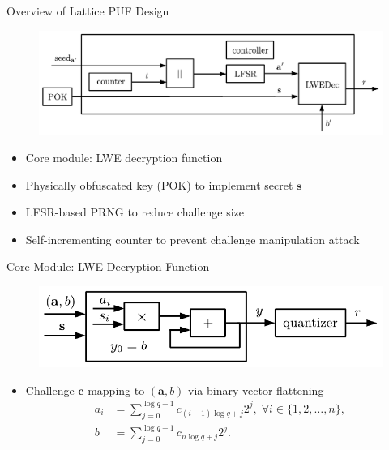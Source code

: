 \begin{frame}{Overview of Lattice PUF Design}
\begin{figure}
    \centering
    \includegraphics[width = 0.95\linewidth]{./fig/TopLevelDesign.pdf} 
\end{figure}    
\begin{itemize}
    \item Core module: LWE decryption function
    \item Physically obfuscated key (POK) to implement secret $\mathbf{s}$
    \item LFSR-based PRNG to reduce challenge size
    \item Self-incrementing counter to prevent challenge manipulation attack
\end{itemize}
\end{frame}

\begin{frame}{Core Module: LWE Decryption Function}
 \begin{figure}
    \centering
    \includegraphics[width = 0.7\linewidth]{./fig/LWEDec.pdf} 
\end{figure}   
\begin{itemize}
    \item Challenge $\mathbf{c}$ mapping to $(\mathbf{a},b)$ via binary vector flattening
\begin{align*}
a_i &= \sum_{j=0}^{\log q-1}c_{(i-1)\log q+j}2^j,\; \forall i\in \{1,2,\ldots,n\}, \\
b &= \sum_{j=0}^{\log q-1}c_{n\log q+j}2^j. 
\end{align*}    
\end{itemize}
\end{frame}

